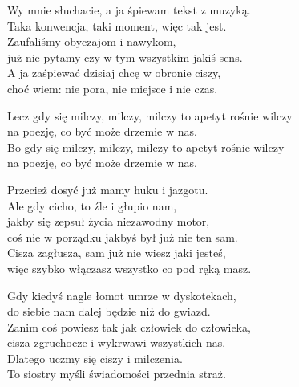 \begin{textn}

    Wy mnie słuchacie, a ja śpiewam tekst z muzyką.\\
    Taka konwencja, taki moment, więc tak jest.\\
    Zaufaliśmy obyczajom i nawykom,\\
    już nie pytamy czy w tym wszystkim jakiś sens.\\
    A ja zaśpiewać dzisiaj chcę w obronie ciszy,\\
    choć wiem: nie pora, nie miejsce i nie czas.

    Lecz gdy się milczy, milczy, milczy to apetyt rośnie wilczy\\
    na poezję, co być może drzemie w nas.\\
    Bo gdy się milczy, milczy, milczy to apetyt rośnie wilczy\\
    na poezję, co być może drzemie w nas.

    Przecież dosyć już mamy huku i jazgotu.\\
    Ale gdy cicho, to źle i głupio nam,\\
    jakby się zepsuł życia niezawodny motor,\\
    coś nie w porządku jakbyś był już nie ten sam.\\
    Cisza zagłusza, sam już nie wiesz jaki jesteś,\\
    więc szybko włączasz wszystko co pod ręką masz.

    Gdy kiedyś nagle łomot umrze w dyskotekach,\\
    do siebie nam dalej będzie niż do gwiazd.\\
    Zanim coś powiesz tak jak człowiek do człowieka,\\
    cisza zgruchocze i wykrwawi wszystkich nas.\\
    Dlatego uczmy się ciszy i milczenia.\\
    To siostry myśli świadomości przednia straż.

\end{textn}
